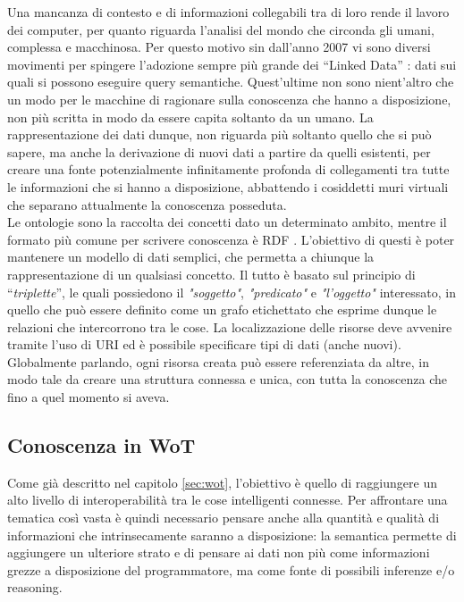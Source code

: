 \documentclass[12pt,a4paper,openright,oneside]{report}
\newcommand{\quotes}[1]{``#1''}
\begin{document}
Una mancanza di contesto e di informazioni collegabili tra di loro rende il lavoro dei computer, per quanto riguarda l'analisi del mondo che circonda gli umani, complessa e macchinosa. Per questo motivo sin dall'anno 2007 vi sono diversi movimenti per spingere l'adozione sempre più grande dei \quotes{Linked Data} \cite{linkeddata}: dati sui quali si possono eseguire query semantiche. Quest'ultime non sono nient'altro che un modo per le macchine di ragionare sulla conoscenza che hanno a disposizione, non più scritta in modo da essere capita soltanto da un umano. La rappresentazione dei dati dunque, non riguarda più soltanto quello che si può sapere, ma anche la derivazione di nuovi dati a partire da quelli esistenti, per creare una fonte potenzialmente infinitamente profonda di collegamenti tra tutte le informazioni che si hanno a disposizione, abbattendo i cosiddetti muri virtuali che separano attualmente la conoscenza posseduta.\\

Le ontologie \cite{ontology} sono la raccolta dei concetti dato un determinato ambito, mentre il formato più comune per scrivere conoscenza è RDF \cite{rdf}. L'obiettivo di questi è poter mantenere un modello di dati semplici, che permetta a chiunque la rappresentazione di un qualsiasi concetto. Il tutto è basato sul principio di \quotes{\textit{triplette}}, le quali possiedono il \textit{"soggetto"}, \textit{"predicato"} e \textit{"l'oggetto"} interessato, in quello che può essere definito come un grafo etichettato che esprime dunque le relazioni che intercorrono tra le cose. La localizzazione delle risorse deve avvenire tramite l'uso di URI ed è possibile specificare tipi di dati (anche nuovi). Globalmente parlando, ogni risorsa creata può essere referenziata da altre, in modo tale da creare una struttura connessa e unica, con tutta la conoscenza che fino a quel momento si aveva.

\subsection{Conoscenza in WoT}
\label{knowledge-wot}
Come già descritto nel capitolo \ref{sec:wot}, l'obiettivo è quello di raggiungere un alto livello di interoperabilità tra le cose intelligenti connesse. Per affrontare una tematica così vasta è quindi necessario pensare anche alla quantità e qualità di informazioni che intrinsecamente saranno a disposizione: la semantica permette di aggiungere un ulteriore strato e di pensare ai dati non più come informazioni grezze a disposizione del programmatore, ma come fonte di possibili inferenze e/o reasoning.\\
\end{document}
